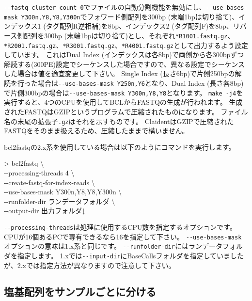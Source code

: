 \documentclass[titlepage,10pt,a4paper]{jsbook}
\newenvironment{cmd}{\begin{oframed}\raggedright\ttfamily\footnotesize\setlength{\baselineskip}{1.4em}}{\end{oframed}\vspace{-1em}}
\begin{document}
\texttt{{-}{-}fastq-cluster-count 0}でファイルの自動分割機能を無効にし、\texttt{{-}{-}use-bases-mask Y300n,Y8,Y8,Y300n}でフォワード側配列を300bp (末端1bpは切り捨て)、インデックス1 (タグ配列R逆相補)を8bp、インデックス2 (タグ配列F)を8bp、リバース側配列を300bp (末端1bpは切り捨て)とし、それぞれ\texttt{*{\textunderscore}R1{\textunderscore}001.fastq.gz}、\texttt{*{\textunderscore}R2{\textunderscore}001.fastq.gz}、\texttt{*{\textunderscore}R3{\textunderscore}001.fastq.gz}、\texttt{*{\textunderscore}R4{\textunderscore}001.fastq.gz}として出力するよう設定しています。
これはDual Index (インデックスは各8bp)で両側から各300bpずつ解読する(300PE)設定でシーケンスした場合ですので、異なる設定でシーケンスした場合は値を適宜変更して下さい。
Single Index (長さ6bp)で片側250bpの解読を行った場合は\texttt{{-}{-}use-bases-mask Y250n,Y6}となり、Dual Index (長さ各8bp)で片側300bpの場合は\texttt{{-}{-}use-bases-mask Y300n,Y8,Y8}となります。
\texttt{make -j4}を実行すると、4つのCPUを使用してBCLからFASTQの生成が行われます。
生成されたFASTQはGZIPというプログラムで圧縮されたものになります。
ファイル名の末尾の拡張子\texttt{.gz}はそれを示すものです。
ClaidentはGZIPで圧縮されたFASTQをそのまま扱えるため、圧縮したままで構いません。

bcl2fastqの2.x系を使用している場合は以下のようにコマンドを実行します。

\begin{cmd}
{\textgreater} bcl2fastq {\textbackslash}\\
{-}{-}processing-threads 4 {\textbackslash}\\
{-}{-}create-fastq-for-index-reads {\textbackslash}\\
{-}{-}use-bases-mask Y300n,Y8,Y8,Y300n {\textbackslash}\\
{-}{-}runfolder-dir ランデータフォルダ {\textbackslash}\\
{-}{-}output-dir 出力フォルダ↓
\end{cmd}

\texttt{{-}{-}processing-threads}は処理に使用するCPU数を指定するオプションです。
CPUが16個あるPCで専有できるなら16を指定して下さい。
\texttt{{-}{-}use-bases-mask}オプションの意味は1.x系と同じです。
\texttt{{-}{-}runfolder-dir}にはランデータフォルダを指定します。
1.xでは\texttt{{-}{-}input-dir}にBaseCallsフォルダを指定していましたが、2.xでは指定方法が異なりますので注意して下さい。

\subsection{塩基配列をサンプルごとに分ける}
\end{document}
